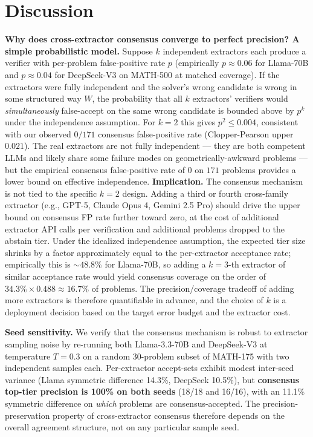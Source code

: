 \documentclass{article}
\begin{document}
\section{Discussion}
\label{sec:discussion}

\textbf{Why does cross-extractor consensus converge to perfect precision? A simple probabilistic model.} Suppose $k$ independent extractors each produce a verifier with per-problem false-positive rate $p$ (empirically $p \approx 0.06$ for Llama-70B and $p \approx 0.04$ for DeepSeek-V3 on MATH-500 at matched coverage). If the extractors were fully independent and the solver's wrong candidate is wrong in some structured way $W$, the probability that all $k$ extractors' verifiers would \emph{simultaneously} false-accept on the same wrong candidate is bounded above by $p^k$ under the independence assumption. For $k{=}2$ this gives $p^2 \le 0.004$, consistent with our observed $0/171$ consensus false-positive rate (Clopper-Pearson upper $0.021$). The real extractors are not fully independent --- they are both competent LLMs and likely share some failure modes on geometrically-awkward problems --- but the empirical consensus false-positive rate of $0$ on $171$ problems provides a lower bound on effective independence. \textbf{Implication.} The consensus mechanism is not tied to the specific $k{=}2$ design. Adding a third or fourth cross-family extractor (e.g., GPT-5, Claude Opus 4, Gemini 2.5 Pro) should drive the upper bound on consensus FP rate further toward zero, at the cost of additional extractor API calls per verification and additional problems dropped to the abstain tier. Under the idealized independence assumption, the expected tier size shrinks by a factor approximately equal to the per-extractor acceptance rate; empirically this is $\sim 48.8\%$ for Llama-70B, so adding a $k{=}3$-th extractor of similar acceptance rate would yield consensus coverage on the order of $34.3\% \times 0.488 \approx 16.7\%$ of problems. The precision/coverage tradeoff of adding more extractors is therefore quantifiable in advance, and the choice of $k$ is a deployment decision based on the target error budget and the extractor cost.

\textbf{Seed sensitivity.} We verify that the consensus mechanism is robust to extractor sampling noise by re-running both Llama-3.3-70B and DeepSeek-V3 at temperature $T{=}0.3$ on a random 30-problem subset of MATH-175 with two independent samples each. Per-extractor accept-sets exhibit modest inter-seed variance (Llama symmetric difference 14.3\%, DeepSeek 10.5\%), but \textbf{consensus top-tier precision is 100\% on both seeds} (18/18 and 16/16), with an 11.1\% symmetric difference on \emph{which} problems are consensus-accepted. The precision-preservation property of cross-extractor consensus therefore depends on the overall agreement structure, not on any particular sample seed.
\end{document}
